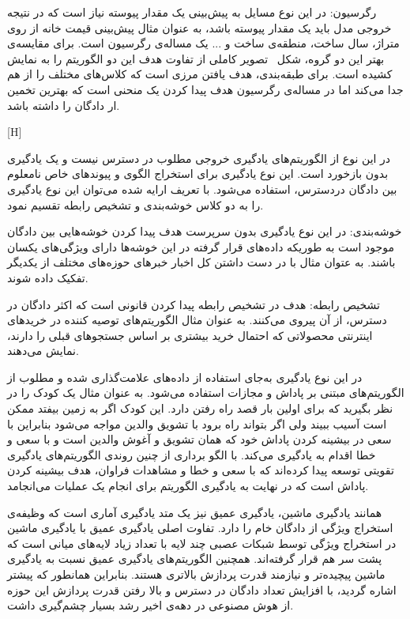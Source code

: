  رگرسیون: در این نوع مسایل به پیش‌بینی یک مقدار پیوسته نیاز است که در نتیجه خروجی مدل باید یک مقدار پیوسته باشد، به عنوان مثال پیش‌بینی قیمت خانه از روی متراژ، سال ساخت، منطقه‌ی ساخت و ... یک مساله‌ی رگرسیون است.
برای مقایسه‌ی بهتر این دو گروه، شکل~ تصویر کاملی از تفاوت هدف این دو الگوریتم را به نمایش کشیده است. برای طبقه‌بندی، هدف یافتن مرزی است که کلاس‌های مختلف را از هم جدا می‌کند اما در مساله‌ی رگرسیون هدف پیدا کردن یک منحنی است که بهترین تخمین ار دادگان را داشته باشد.

[H]

در این نوع از الگوریتم‌های یادگیری خروجی مطلوب در دسترس نیست و یک یادگیری بدون بازخورد است. این نوع یادگیری برای استخراج الگوی و پیوندهای خاص نامعلوم بین دادگان دردسترس، استفاده می‌شود. با تعریف ارایه شده می‌توان این نوع یادگیری را به دو کلاس خوشه‌بندی و تشخیص رابطه تقسیم نمود.

 خوشه‌بندی: در این نوع یادگیری بدون سرپرست هدف پیدا کردن خوشه‌هایی بین دادگان موجود است به ‌طوریکه داده‌های قرار گرفته در این خوشه‌ها دارای ویژگی‌های یکسان باشند. به عتوان مثال با در دست داشتن کل اخبار خبر‌های حوزه‌های مختلف از یکدیگر تفکیک داده شوند.

 تشخیص رابطه: هدف در تشخیص رابطه پیدا کردن قانونی است که اکثر دادگان در دسترس، از آن پیروی می‌کنند. به عنوان مثال الگوریتم‌های توصیه کننده در خرید‌های اینترنتی محصولاتی که احتمال خرید بیشتری بر اساس جستجوهای قبلی را دارند، نمایش می‌دهند.

در این نوع یادگیری به‌جای استفاده از داده‌های علامت‌گذاری شده و مطلوب از الگوریتم‌های مبتنی بر پاداش و مجازات استفاده می‌شود. به عنوان مثال یک کودک را در نظر بگیرید که برای اولین بار قصد راه رفتن دارد. این کودک اگر به زمین بیفتد ممکن است آسیب ببیند ولی اگر بتواند راه برود با تشویق والدین مواجه می‌شود بنابراین با سعی در بیشینه کردن پاداش خود که همان تشویق و آغوش والدین است و با سعی و خطا اقدام به یادگیری می‌کند. با الگو برداری از چنین روندی الگوریتم‌های یادگیری تقویتی توسعه پیدا کرده‌اند که با سعی و خطا و مشاهدات فراوان، هدف بیشینه کردن پاداش است که در نهایت به یادگیری الگوریتم برای انجام یک عملیات می‌انجامد. 

همانند یادگیری ماشین، یادگیری عمیق نیز یک متد یادگیری آماری است که وظیفه‌ی استخراج ویژگی از دادگان خام را دارد. تفاوت اصلی یادگیری عمیق با یادگیری ماشین در استخراج ویژگی توسط شبکات عصبی چند لایه با تعداد زیاد لایه‌های میانی است که پشت سر هم قرار گرفته‌اند. همچنین الگوریتم‌های یادگیری عمیق نسبت به یادگیری ماشین پیچیده‌تر و نیازمند قدرت پردازش بالاتری هستند. بنابراین همانطور که پیشتر اشاره گردید، با افزایش تعداد دادگان در دسترس و بالا رفتن قدرت پردازش این حوزه از هوش مصنوعی در دهه‌ی اخیر رشد بسیار چشم‌گیری داشت.

